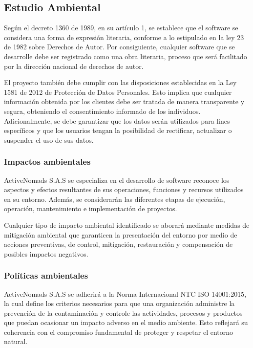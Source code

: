 \subsection{Estudio Ambiental}

{\color{red}
Según el decreto 1360 de 1989, en su artículo 1, se establece que el software se considera una forma de expresión literaria, conforme a lo estipulado en la ley 23 de 1982 sobre Derechos de Autor. Por consiguiente, cualquier software que se desarrolle debe ser registrado como una obra literaria, proceso que será facilitado por la dirección nacional de derechos de autor. 

El proyecto también debe cumplir con las disposiciones establecidas en la Ley 1581 de 2012 de Protección de Datos Personales. Esto implica que cualquier información obtenida por los clientes debe ser tratada de manera transparente y segura, obteniendo el consentimiento informado de los individuos. Adicionalmente, se debe garantizar que los datos serán utilizados para fines específicos y que los usuarios tengan la posibilidad de rectificar, actualizar o suspender el uso de sus datos.  


\subsubsection*{Impactos ambientales}

 ActiveNomads S.A.S se especializa en el desarrollo de software reconoce los aspectos y efectos resultantes de sus operaciones, funciones y recursos utilizados en su entorno. Además, se considerarán las diferentes etapas de ejecución, operación, mantenimiento e implementación de proyectos. 

Cualquier tipo de impacto ambiental identificado se aborará mediante medidas de mitigación ambiental que garanticen la presentación del entorno por medio de acciones preventivas, de control, mitigación, restauración y compensación de posibles impactos negativos. 

\subsubsection*{Políticas ambientales}

ActiveNomads S.A.S se adherirá a la Norma Internacional NTC ISO 14001:2015, la cual define los criterios necesarios para que una organización administre la prevención de la contaminación y controle las actividades, procesos y productos que puedan ocasionar un impacto adverso en el medio ambiente. Esto reflejará su coherencia con el compromiso fundamental de proteger y respetar el entorno natural. 

}
